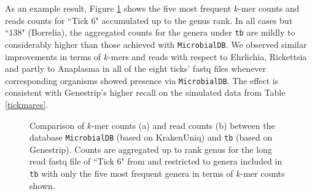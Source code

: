 \documentclass[pdflatex,sn-vancouver-num]{sn-jnl}
\begin{document}
    As an example result, Figure \ref{genusestick6} shows the five most frequent $k$-mer counts and reads counts for ``Tick 6" accumulated up to the genus rank. In all cases but ``138" (Borrelia), the aggregated counts for the genera under \texttt{tb} are mildly to considerably higher than those achieved with \texttt{MicrobialDB}. We observed similar improvements in terms of $k$-mers and reads with respect to Ehrlichia, Rickettsia and partly to Anaplasma in all of the eight ticks' fastq files whenever corresponding organisms showed presence via \texttt{MicrobialDB}. The effect is consistent with Genestrip's higher recall on the simulated data from Table \ref{tickmares}.

    \begin{figure}[h]%
        \centering
        \footnotesize
        \hspace{0.5cm}
        \caption{Comparison of $k$-mer counts (a) and read counts (b) between the database \texttt{MicrobialDB} (based on KrakenUniq) and \texttt{tb} (based on Genestrip). Counts are aggregated up to rank genus for the long read fastq file of ``Tick 6" from \cite{nanoporeticks} and restricted to genera included in \texttt{tb} with only the five most frequent genera in terms of $k$-mer counts shown.}
        \label{genusestick6}
    \end{figure}
\end{document}
